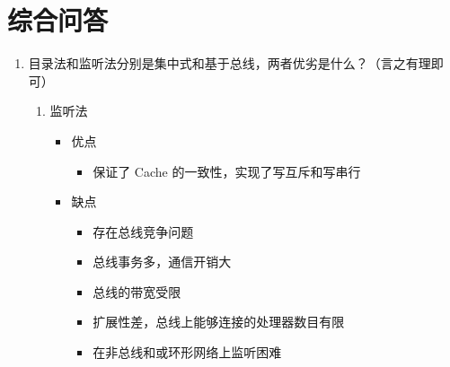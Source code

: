 \documentclass[UTF8]{article}
\begin{document}
    \section{综合问答}
    \begin{enumerate}
        \item 目录法和监听法分别是集中式和基于总线，两者优劣是什么？（言之有理即可）
        \begin{enumerate}
            \item 监听法
            \begin{itemize}
                \item 优点
                \begin{itemize}
                    \item 保证了 Cache 的一致性，实现了写互斥和写串行
                \end{itemize}
                \item 缺点
                \begin{itemize}
                    \item 存在总线竞争问题
                    \item 总线事务多，通信开销大
                    \item 总线的带宽受限
                    \item 扩展性差，总线上能够连接的处理器数目有限
                    \item 在非总线和或环形网络上监听困难
                \end{itemize}
            \end{itemize}


\end{enumerate}
\end{enumerate}
\end{document}
